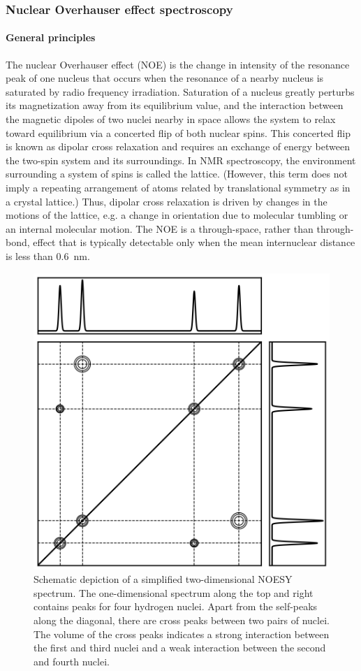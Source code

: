 \documentclass[9pt,review]{livecoms}
\begin{document}

\subsubsection{Nuclear Overhauser effect spectroscopy}
\label{sub2:noesy}

\paragraph{General principles}

The nuclear Overhauser effect (NOE) is the change in intensity of the resonance peak of one nucleus that occurs when the resonance of a nearby nucleus is saturated by radio frequency irradiation.
Saturation of a nucleus greatly perturbs its magnetization away from its equilibrium value, and the interaction between the magnetic dipoles of two nuclei nearby in space allows the system to relax toward equilibrium via a concerted flip of both nuclear spins.
This concerted flip is known as dipolar cross relaxation and requires an exchange of energy between the two-spin system and its surroundings.
In NMR spectroscopy, the environment surrounding a system of spins is called the lattice.
(However, this term does not imply a repeating arrangement of atoms related by translational symmetry as in a crystal lattice.)
Thus, dipolar cross relaxation is driven by changes in the motions of the lattice, e.g. a change in orientation due to molecular tumbling or an internal molecular motion.
The NOE is a through-space, rather than through-bond, effect that is typically detectable only when the mean internuclear distance is less than \qty{0.6}{\nano\meter}.

\begin{figure}[t]
    \centering
    \label{fig:noesy-2d}
    \includegraphics[width=3 in]{paper/figures/noesy-2d.png}
    \caption{Schematic depiction of a simplified two-dimensional NOESY spectrum. The one-dimensional spectrum along the top and right contains peaks for four hydrogen nuclei. Apart from the self-peaks along the diagonal, there are cross peaks between two pairs of nuclei. The volume of the cross peaks indicates a strong interaction between the first and third nuclei and a weak interaction between the second and fourth nuclei.}
\end{figure}
\end{document}

